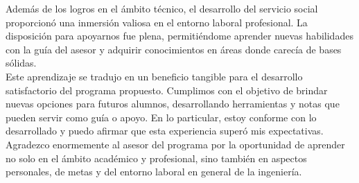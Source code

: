 \documentclass[a4paper,12pt]{article}
\begin{document}
        Además de los logros en el ámbito técnico, el desarrollo del servicio social proporcionó una inmersión valiosa en el entorno laboral profesional. La disposición para apoyarnos fue plena, permitiéndome aprender nuevas habilidades con la guía del asesor y adquirir conocimientos en áreas donde carecía de bases sólidas.\\
        Este aprendizaje se tradujo en un beneficio tangible para el desarrollo satisfactorio del programa propuesto. Cumplimos con el objetivo de brindar nuevas opciones para futuros alumnos, desarrollando herramientas y notas que pueden servir como guía o apoyo. En lo particular, estoy conforme con lo desarrollado y puedo afirmar que esta experiencia superó mis expectativas. Agradezco enormemente al asesor del programa por la oportunidad de aprender no solo en el ámbito académico y profesional, sino también en aspectos personales, de metas y del entorno laboral en general de la ingeniería.

    \printbibliography 
\end{document}
